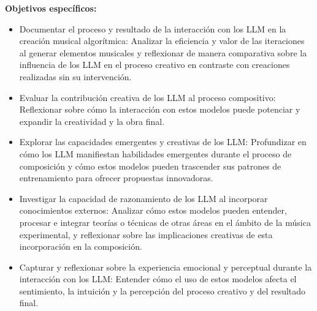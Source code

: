 \textbf{Objetivos específicos:}
\begin{itemize}
    \item Documentar el proceso y resultado de la interacción con los LLM en la creación musical algorítmica: Analizar la eficiencia y valor de las iteraciones al generar elementos musicales y reflexionar de manera comparativa sobre la influencia de los LLM en el proceso creativo en contraste con creaciones realizadas sin su intervención.
    \item Evaluar la contribución creativa de los LLM al proceso compositivo: Reflexionar sobre cómo la interacción con estos modelos puede potenciar y expandir la creatividad y la obra final.
    \item Explorar las capacidades emergentes y creativas de los LLM: Profundizar en cómo los LLM manifiestan habilidades emergentes durante el proceso de composición y cómo estos modelos pueden trascender sus patrones de entrenamiento para ofrecer propuestas innovadoras.
    \item Investigar la capacidad de razonamiento de los LLM al incorporar conocimientos externos: Analizar cómo estos modelos pueden entender, procesar e integrar teorías o técnicas de otras áreas en el ámbito de la música experimental, y reflexionar sobre las implicaciones creativas de esta incorporación en la composición.
    \item Capturar y reflexionar sobre la experiencia emocional y perceptual durante la interacción con los LLM: Entender cómo el uso de estos modelos afecta el sentimiento, la intuición y la percepción del proceso creativo y del resultado final.
\end{itemize}
